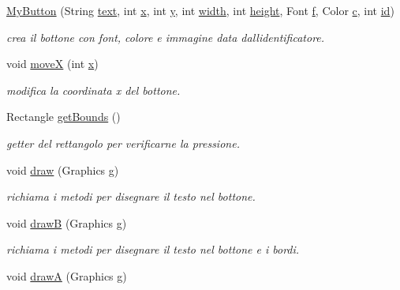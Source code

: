 \begin{DoxyCompactItemize}
\hyperlink{classui_1_1_my_button_a803c3604f39ead35cb302ccc35d474f4}{My\+Button} (String \hyperlink{classui_1_1_my_button_a685ed5195435d2b3e75433f46aec6e1e}{text}, int \hyperlink{classui_1_1_my_button_a6150e0515f7202e2fb518f7206ed97dc}{x}, int \hyperlink{classui_1_1_my_button_a0a2f84ed7838f07779ae24c5a9086d33}{y}, int \hyperlink{classui_1_1_my_button_a2474a5474cbff19523a51eb1de01cda4}{width}, int \hyperlink{classui_1_1_my_button_ad12fc34ce789bce6c8a05d8a17138534}{height}, Font \hyperlink{classui_1_1_my_button_a3fb562f10e8f7f83cb2ed130eab6d439}{f}, Color \hyperlink{classui_1_1_my_button_a02094092ae89aa4b23bff1976bcbf90d}{c}, int \hyperlink{classui_1_1_my_button_a7441ef0865bcb3db9b8064dd7375c1ea}{id})
\begin{DoxyCompactList}\small\item\em crea il bottone con font, colore e immagine data dall\textquotesingle{}identificatore. \end{DoxyCompactList}\item 
void \hyperlink{classui_1_1_my_button_ae9dd3fa33b931bab6ba8d7ec2cc24549}{moveX} (int \hyperlink{classui_1_1_my_button_a6150e0515f7202e2fb518f7206ed97dc}{x})
\begin{DoxyCompactList}\small\item\em modifica la coordinata x del bottone. \end{DoxyCompactList}\item 
Rectangle \hyperlink{classui_1_1_my_button_a187945475e730bfa340a10f63224e91f}{get\+Bounds} ()
\begin{DoxyCompactList}\small\item\em getter del rettangolo per verificarne la pressione. \end{DoxyCompactList}\item 
void \hyperlink{classui_1_1_my_button_a72fe1ffca978e99fd16994a10e7f8051}{draw} (Graphics g)
\begin{DoxyCompactList}\small\item\em richiama i metodi per disegnare il testo nel bottone. \end{DoxyCompactList}\item 
void \hyperlink{classui_1_1_my_button_a85f135df7a0669cda6dcdf8ca393a90c}{drawB} (Graphics g)
\begin{DoxyCompactList}\small\item\em richiama i metodi per disegnare il testo nel bottone e i bordi. \end{DoxyCompactList}\item 
void \hyperlink{classui_1_1_my_button_a73a12c436143ada4de08e87bb3513ab1}{drawA} (Graphics g)

\end{DoxyCompactItemize}

